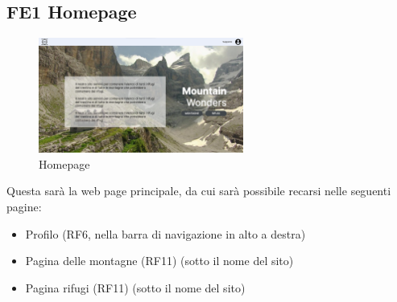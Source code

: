 \documentclass[a4paper,12pt]{article}
\begin{document}
\subsection*{FE1 Homepage}
\begin{figure}[ht]
   \centering
    \includegraphics[width=0.6\textwidth]{img/Homepage.png}
    \caption{Homepage}
\end{figure}
Questa sarà la web page principale, da cui sarà possibile recarsi nelle seguenti pagine:
\begin{itemize}
    \item Profilo (RF6, nella barra di navigazione in alto a destra)
    \item Pagina delle montagne (RF11) (sotto il nome del sito)
    \item Pagina rifugi (RF11) (sotto il nome del sito)
\end{itemize}
\end{document}
